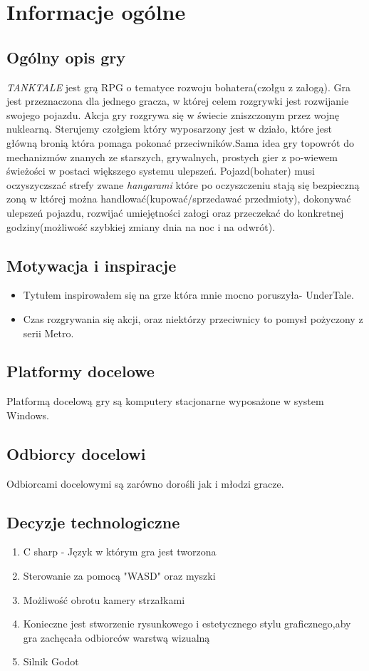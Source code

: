 \documentclass{article}
\begin{document}
\newpage

\section{Informacje ogólne}
    \subsection{Ogólny opis gry}
    \emph{TANKTALE} jest grą RPG o tematyce rozwoju bohatera(czołgu z załogą). Gra jest przeznaczona dla jednego gracza, w której celem rozgrywki jest rozwijanie swojego pojazdu. Akcja gry rozgrywa się w świecie zniszczonym przez wojnę nuklearną. Sterujemy czołgiem który wyposarzony jest w działo, które jest główną bronią która pomaga pokonać przeciwników.Sama  idea  gry  topowrót do mechanizmów znanych ze starszych, grywalnych, prostych gier z po-wiewem świeżości w postaci większego systemu ulepszeń. Pojazd(bohater) musi oczyszyczszać strefy zwane \emph{hangarami} które po oczyszczeniu stają się bezpieczną zoną w której można handlować(kupować/sprzedawać przedmioty), dokonywać ulepszeń pojazdu, rozwijać umiejętności załogi oraz przeczekać do konkretnej godziny(możliwość szybkiej zmiany dnia na noc i na odwrót). 
    
    \subsection{Motywacja i inspiracje}
    \begin{itemize}
        \item Tytułem inspirowałem się na grze która mnie mocno poruszyła- UnderTale.
        \item Czas rozgrywania się akcji, oraz niektórzy przeciwnicy to pomysł pożyczony z serii Metro.
    \end{itemize}
    \subsection{Platformy docelowe}
    Platformą docelową gry są komputery stacjonarne wyposażone w system Windows.
    \subsection{Odbiorcy docelowi}
    Odbiorcami docelowymi są zarówno dorośli jak i młodzi gracze.
    \subsection{Decyzje technologiczne}
    \begin{enumerate}
       \item C sharp - Język w którym gra jest tworzona
    \item Sterowanie za pomocą "WASD" oraz myszki
     \item Możliwość obrotu kamery strzałkami
     \item Konieczne  jest  stworzenie  rysunkowego  i  estetycznego  stylu  graficznego,aby gra zachęcała odbiorców warstwą wizualną \item Silnik Godot
\end{enumerate}
\end{document}
